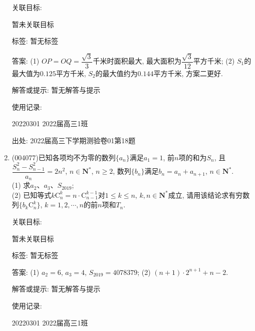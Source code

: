 \documentclass[10pt,a4paper]{article}
\begin{document}
\begin{enumerate}[1.]
关联目标:

暂未关联目标



标签: 暂无标签

答案: (1) $OP=OQ=\dfrac{\sqrt{3}}3$千米时面积最大, 最大面积为$\dfrac{\sqrt{3}}{12}$平方千米; (2) $S_1$的最大值为$0.125$平方千米, $S_2$的最大值约为$0.144$平方千米, 方案二更好.

解答或提示: 暂无解答与提示

使用记录:

20220301	2022届高三1班		


出处: 2022届高三下学期测验卷01第18题
\item { (004077)}已知各项均不为零的数列$\{a_n\}$满足$a_1=1$, 前$n$项的和为$S_n$, 且$\dfrac{S_n^2-S_{n-1}^2}{a_n}=2n^2$,
$n\in \mathbf{N}^*$, $n\ge 2$, 数列$\{b_n\}$满足$b_n=a_n+a_{n+1}$, $n\in \mathbf{N}^*$.\\
(1) 求$a_2$、$a_3$、$S_{2019}$;\\
(2) 已知等式$k\mathrm{C}_n^k=n\cdot \mathrm{C}_{n-1}^{k-1}$对$1\le k\le n$, $k,n\in \mathbf{N}^*$成立, 请用该结论求有穷数列$\{b_k\mathrm{C}_n^k\}$, $k=1,2,\cdots,n$的前$n$项和$T_n$.


关联目标:

暂未关联目标



标签: 暂无标签

答案: (1) $a_2=6$, $a_3=4$, $S_{2019}=4078379$; (2) $(n+1)\cdot 2^{n+1}+n-2$.

解答或提示: 暂无解答与提示

使用记录:

20220301	2022届高三1班		



\end{enumerate}
\end{document}
